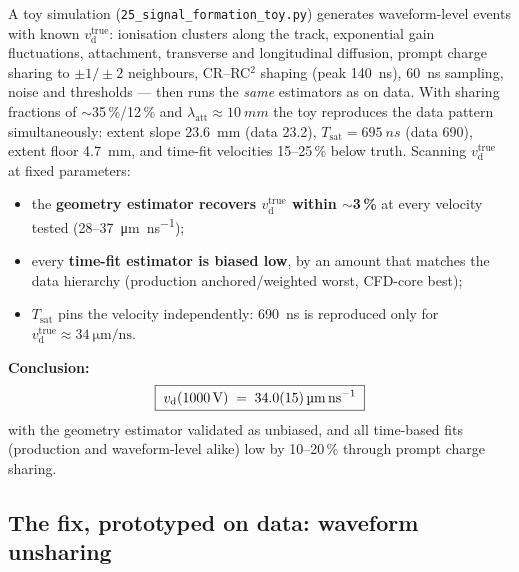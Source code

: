 \documentclass[11pt,a4paper]{article}
\newcommand{\vd}{v_{\mathrm{d}}}
\newcommand{\Tsat}{T_{\mathrm{sat}}}
\newcommand{\umns}{\micro\meter\per\nano\second}
\begin{document}
A toy simulation (\texttt{25\_signal\_formation\_toy.py}) generates
waveform-level events with known $\vd^{\mathrm{true}}$: ionisation clusters
along the track, exponential gain fluctuations, attachment, transverse and
longitudinal diffusion, prompt charge sharing to $\pm1/\pm2$ neighbours,
CR--RC$^2$ shaping (peak \SI{140}{ns}), \SI{60}{ns} sampling, noise and
thresholds --- then runs the \emph{same} estimators as on data.  With
sharing fractions of $\sim$35\,\%/12\,\% and
$\lambda_{\mathrm{att}}\approx\SI{10}{mm}$ the toy reproduces the data
pattern simultaneously: extent slope \SI{23.6}{mm} (data 23.2),
$\Tsat = \SI{695}{ns}$ (data 690), extent floor \SI{4.7}{mm}, and time-fit
velocities 15--25\,\% below truth.  Scanning $\vd^{\mathrm{true}}$ at fixed
parameters:
\begin{itemize}
  \item the \textbf{geometry estimator recovers $\vd^{\mathrm{true}}$ within
        $\sim$3\,\%} at every velocity tested (28--37~\si{\umns});
  \item every \textbf{time-fit estimator is biased low}, by an amount that
        matches the data hierarchy (production anchored/weighted worst,
        CFD-core best);
  \item $\Tsat$ pins the velocity independently: \SI{690}{ns} is reproduced
        only for $\vd^{\mathrm{true}} \approx \SI{34}{\umns}$.
\end{itemize}

\noindent\textbf{Conclusion:}
\begin{equation}
  \boxed{\;\vd(\SI{1000}{V}) \;=\; \SI{34 \pm 1.5}{\umns}\;}
\end{equation}
with the geometry estimator validated as unbiased, and all time-based fits
(production and waveform-level alike) low by 10--20\,\% through prompt
charge sharing.

\subsection{The fix, prototyped on data: waveform unsharing}
\label{sec:unsharing}
\end{document}
